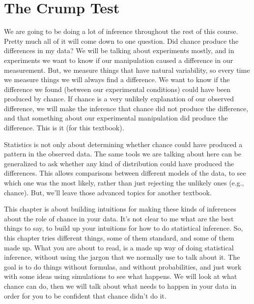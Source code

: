 \documentclass[
  letterpaper,
  DIV=11,
  numbers=noendperiod]{scrreprt}
\begin{document}
\section{The Crump Test}\label{the-crump-test}

We are going to be doing a lot of inference throughout the rest of this
course. Pretty much all of it will come down to one question. Did chance
produce the differences in my data? We will be talking about experiments
mostly, and in experiments we want to know if our manipulation caused a
difference in our measurement. But, we measure things that have natural
variability, so every time we measure things we will always find a
difference. We want to know if the difference we found (between our
experimental conditions) could have been produced by chance. If chance
is a very unlikely explanation of our observed difference, we will make
the inference that chance did not produce the difference, and that
something about our experimental manipulation did produce the
difference. This is it (for this textbook).

\begin{tcolorbox}[enhanced jigsaw, title=\textcolor{quarto-callout-note-color}{\faInfo}\hspace{0.5em}{Note}, colframe=quarto-callout-note-color-frame, colbacktitle=quarto-callout-note-color!10!white, bottomtitle=1mm, leftrule=.75mm, rightrule=.15mm, titlerule=0mm, arc=.35mm, colback=white, opacitybacktitle=0.6, toprule=.15mm, toptitle=1mm, bottomrule=.15mm, coltitle=black, breakable, left=2mm, opacityback=0]

Statistics is not only about determining whether chance could have
produced a pattern in the observed data. The same tools we are talking
about here can be generalized to ask whether any kind of distribution
could have produced the differences. This allows comparisons between
different models of the data, to see which one was the most likely,
rather than just rejecting the unlikely ones (e.g., chance). But, we'll
leave those advanced topics for another textbook.

\end{tcolorbox}

This chapter is about building intuitions for making these kinds of
inferences about the role of chance in your data. It's not clear to me
what are the best things to say, to build up your intuitions for how to
do statistical inference. So, this chapter tries different things, some
of them standard, and some of them made up. What you are about to read,
is a made up way of doing statistical inference, without using the
jargon that we normally use to talk about it. The goal is to do things
without formulas, and without probabilities, and just work with some
ideas using simulations to see what happens. We will look at what chance
can do, then we will talk about what needs to happen in your data in
order for you to be confident that chance didn't do it.
\end{document}
